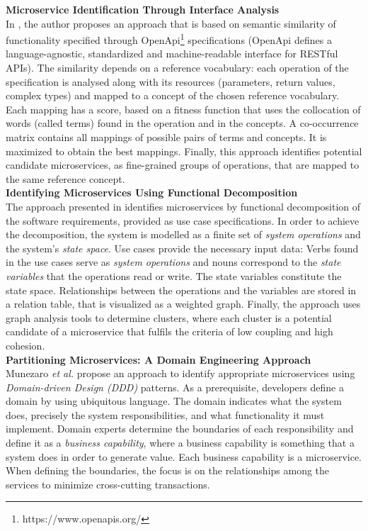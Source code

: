 \noindent
\textbf{Microservice Identification Through Interface Analysis   } \\
In \cite{interfaceAnalysisBaresi}, the author proposes an approach that is based on semantic similarity of functionality specified through OpenApi\footnote{https://www.openapis.org/} specifications (OpenApi defines a language-agnostic, standardized and machine-readable interface for RESTful APIs). The similarity depends on a reference vocabulary: each operation of the specification is analysed along with its resources (parameters, return values, complex types) and mapped to a concept of the chosen reference vocabulary. Each mapping has a score, based on a fitness function that uses the collocation of words (called terms) found in the operation and in the concepts. A co-occurrence matrix contains all mappings of possible pairs of terms and concepts. It is maximized to obtain the best mappings. Finally, this approach identifies potential candidate microservices, as fine-grained groups of operations, that are mapped to the same reference concept. \\


\noindent
\textbf{Identifying Microservices Using Functional Decomposition  } \\
The approach presented in \cite{FunctionalDecompositionHeinrich} identifies microservices by functional decomposition of the software requirements, provided as use case specifications. In order to achieve the decomposition, the system is  modelled as a finite set of \textit{system operations} and the system's \textit{state space}. Use cases provide the necessary input data: Verbs found in the use cases serve as \textit{system operations} and nouns correspond to the \textit{state variables} that the operations read or write. The state variables constitute the state space. Relationships between the operations and the variables are stored in a relation table, that is visualized as a weighted graph. Finally, the approach uses graph analysis tools to determine clusters, where each cluster is a potential candidate of a microservice that fulfils the criteria of low coupling and high cohesion. \\



\noindent
\textbf{Partitioning Microservices: A Domain Engineering Approach } \\
Munezaro \textit{et al.} \cite{DomainEngineeringMunezero} propose an approach to identify appropriate microservices using \textit{Domain-driven Design (DDD)} patterns. As a prerequisite, developers define a domain by using ubiquitous language. The domain indicates what the system does, precisely the system responsibilities, and what functionality it must implement. Domain experts determine the boundaries of each responsibility and define it as a \textit{business capability}, where a business capability is something that a system does in order to generate value. Each business capability is a microservice. When defining the boundaries, the focus is on the relationships among the services to minimize cross-cutting transactions. \\

